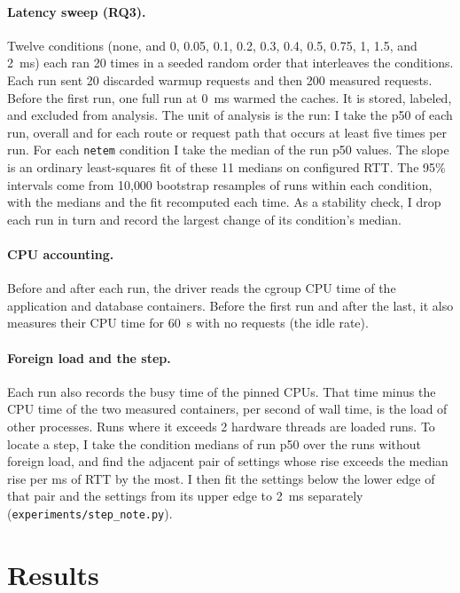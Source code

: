 \documentclass[11pt]{article}
\begin{document}
\paragraph{Latency sweep (RQ3).} Twelve conditions (none, and 0, 0.05, 0.1, 0.2, 0.3, 0.4,
0.5, 0.75, 1, 1.5, and 2~ms) each ran 20 times in a seeded random order that interleaves the
conditions. Each run sent 20
discarded warmup requests and then 200 measured requests. Before the first run, one full run
at 0~ms warmed the caches. It is stored, labeled, and excluded from analysis. The unit of
analysis is the run: I take the p50 of each run, overall and for each route or request path
that occurs at least five times per run. For each \texttt{netem} condition I take the median of the run p50 values. The slope is an
ordinary least-squares fit of these 11 medians on configured RTT. The 95\% intervals come from
10{,}000 bootstrap resamples of runs within each condition, with the medians and the fit
recomputed each time. As a stability check, I drop each run in turn and record the largest
change of its condition's median.

\paragraph{CPU accounting.} Before and after each run, the driver reads the cgroup CPU time
of the application and database containers. Before the first run and after the last, it also
measures their CPU time for 60~s with no requests (the idle rate).

\paragraph{Foreign load and the step.} Each run also records the busy time of the pinned CPUs.
That time minus the CPU time of the two measured containers, per second of wall time, is the
load of other processes. Runs where it exceeds 2 hardware threads are loaded runs. To locate a
step, I take the condition medians of run p50 over the runs without foreign load, and find the
adjacent pair of settings whose rise exceeds the median rise per ms of RTT by the most. I then
fit the settings below the lower edge of that pair and the settings from its upper edge to
2~ms separately (\texttt{experiments/step\_note.py}).

\section{Results}
\end{document}
